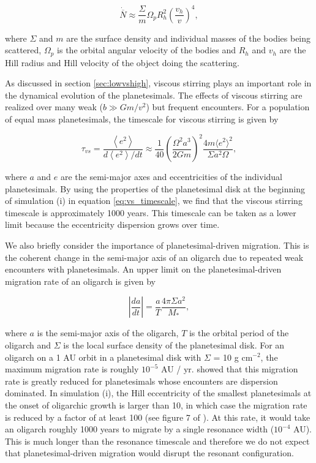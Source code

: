 \begin{equation}\label{eq:scatter}
\dot{\overline{N}} \approx \frac{\Sigma}{m} \Omega_{p} R_{h}^2 \left( \frac{v_{h}}{v} \right)^{4},
\end{equation}

\noindent \cite{murrayclay06} where $\Sigma$ and $m$ are the surface density and individual masses of the bodies being 
scattered, $\Omega_{p}$ is the orbital angular velocity of the bodies and $R_{h}$ and $v_{h}$ are the Hill radius and Hill velocity 
of the object doing the scattering.

As discussed in section \ref{sec:lowvshigh}, viscous stirring plays an important role in the dynamical evolution of the 
planetesimals. The effects of viscous stirring are realized over many weak ($b \gg G m / v^{2}$) but frequent encounters. For a 
population of equal mass planetesimals, the timescale for viscous stirring is given by \cite{ida93}

\begin{equation}\label{eq:vs_timescale}
    \tau_{vs}  = \frac{\left< e^2 \right>}{d \left< e^2 \right> / dt} \approx \frac{1}{40}\left(\frac{\Omega^{2} a^{3}}{2 G m}\right)^{2} \frac{4 m \langle e^{2} \rangle^{2}}{\Sigma a^{2} \Omega},
\end{equation}

\noindent where $a$ and $e$ are the semi-major axes and eccentricities of the individual planetesimals. By using the properties 
of the planetesimal disk at the beginning of simulation (i) in equation \ref{eq:vs_timescale}, we find that the viscous stirring 
timescale is approximately 1000 years. This timescale can be taken as a lower limit because the eccentricity dispersion grows 
over time.

We also briefly consider the importance of planetesimal-driven migration. This is the coherent change in the semi-major axis of 
an oligarch due to repeated weak encounters with planetesimals. An upper limit on the planetesimal-driven migration rate of an 
oligarch is given by \cite{ida00}

\begin{equation}\label{eq:mig}
    \left| \frac{d a}{d t} \right| = \frac{a}{T} \frac{4 \pi \Sigma a^{2}}{M_{*}},
\end{equation}

\noindent where $a$ is the semi-major axis of the oligarch, $T$ is the orbital period of the oligarch and $\Sigma$ is the local 
surface density of the planetesimal disk. For an oligarch on a 1 AU orbit in a planetesimal disk with $\Sigma$ = 10 g cm$^{-2}$, 
the maximum migration rate is roughly $10^{-5}$ AU / yr. \cite{kirsh09} showed that this migration rate is greatly reduced for 
planetesimals whose encounters are dispersion dominated. In simulation (i), the Hill eccentricity of the smallest planetesimals at 
the onset of oligarchic growth is larger than 10, in which case the migration rate is reduced by a factor of at least 100 (see figure 
7 of \cite{kirsh09}). At this rate, it would take an oligarch roughly 1000 years to migrate by a single resonance width ($10^{-4}$ 
AU). This is much longer than the resonance timescale and therefore we do not expect that planetesimal-driven migration would 
disrupt the resonant configuration.

